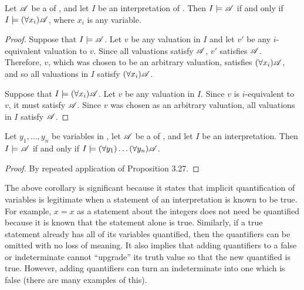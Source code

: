 \begin{proposition}
  Let \(\mathscr{A}\) be a \wf{} of \cl{}, and let \(I\) be an interpretation of \cl{}. Then \(I \models \mathscr{A}\) if and only if \(I \models (\forall x_i) \mathscr{A}\), where \(x_i\) is any variable.

  \begin{proof}
    \Ra{} Suppose that \(I \models \mathscr{A}\). Let \(v\) be any valuation in \(I\) and let \(v'\) be any \(i\)-equivalent valuation to \(v\). Since all valuations satisfy \(\mathscr{A}\), \(v'\) satisfies \(\mathscr{A}\). Therefore, \(v\), which was chosen to be an arbitrary valuation, satisfies \((\forall x_i)\mathscr{A}\), and so all valuations in \(I\) satisfy \((\forall x_i)\mathscr{A}\).

    \La{} Suppose that \(I \models (\forall x_i) \mathscr{A}\). Let \(v\) be any valuation in \(I\). Since \(v\) is \(i\)-equivalent to \(v\), it must satisfy \(\mathscr{A}\). Since \(v\) was chosen as an arbitrary valuation, all valuations in \(I\) satisfy \(\mathscr{A}\).
  \end{proof}
\end{proposition}

\begin{corollary}
  Let \(y_1, \dots, y_n\) be variables in \cl{}, let \(\mathscr{A}\) be a \wf{} of \cl{}, and let \(I\) be an interpretation. Then \(I \models \mathscr{A}\) if and only if \(I \models (\forall y_1) \dots (\forall y_n) \mathscr{A}\).

  \begin{proof}
    By repeated application of Proposition 3.27.
  \end{proof}
\end{corollary}

The above corollary is significant because it states that implicit quantification of variables is legitimate when a statement of an interpretation is known to be true. For example, \(x = x\) as a statement about the integers does not need be quantified because it is known that the statement alone is true. Similarly, if a true statement already has all of its variables quantified, then the quantifiers can be omitted with no loss of meaning. It also implies that adding quantifiers to a false or indeterminate \wf{} cannot ``upgrade'' its truth value so that the new quantified \wf{} is true. However, adding quantifiers can turn an indeterminate \wf{} into one which is false (there are many examples of this).

